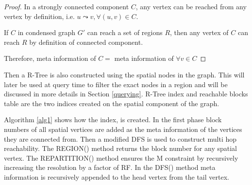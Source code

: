 \begin{proof}
In a strongly connected component $C$, any vertex can be reached from any vertex by definition, i.e. $u \leadsto v, \forall (u, v) \in C$. 

If $C$ in condensed graph $G'$ can reach a set of regions $R$, then any vertex of $C$ can reach $R$ by definition of connected component.

Therefore, meta information of $C =$ meta information of $\forall v \in C$
\end{proof}

Then a R-Tree is also constructed using the spatial nodes in the graph. This will later be used at query time to filter the exact nodes in a region and will be discussed in more details in Section \ref{querying}. R-Tree index and reachable blocks table are the two indices created on the spatial component of the graph.

Algorithm \ref{alg1} shows how the index, {\rrpspatial} is created. In the first phase block numbers of all spatial vertices are added as the meta information of the vertices they are connected from. Then a modified DFS is used to construct multi hop reachability. The REGION() method returns the block number for any spatial vertex. The REPARTITION() method ensures the M constraint by recursively increasing the resolution by a factor of RF. In the DFS() method meta information is recursively appended to the head vertex from the tail vertex.

